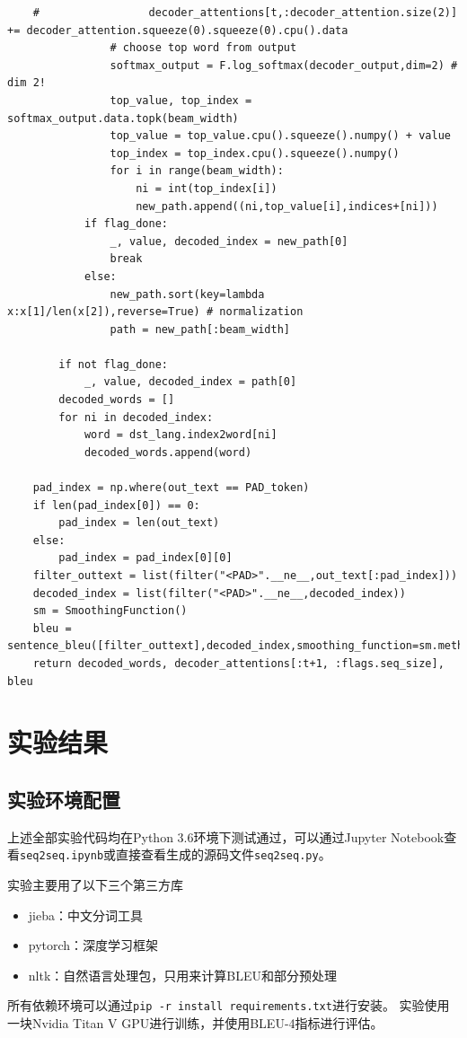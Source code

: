 \documentclass[logo,reportComp]{thesis}
\begin{document}
\begin{lstlisting}
    #                 decoder_attentions[t,:decoder_attention.size(2)] += decoder_attention.squeeze(0).squeeze(0).cpu().data
                # choose top word from output
                softmax_output = F.log_softmax(decoder_output,dim=2) # dim 2!
                top_value, top_index = softmax_output.data.topk(beam_width)
                top_value = top_value.cpu().squeeze().numpy() + value
                top_index = top_index.cpu().squeeze().numpy()
                for i in range(beam_width):
                    ni = int(top_index[i])
                    new_path.append((ni,top_value[i],indices+[ni]))
            if flag_done:
                _, value, decoded_index = new_path[0]
                break
            else:
                new_path.sort(key=lambda x:x[1]/len(x[2]),reverse=True) # normalization
                path = new_path[:beam_width]

        if not flag_done:
            _, value, decoded_index = path[0]
        decoded_words = []
        for ni in decoded_index:
            word = dst_lang.index2word[ni]
            decoded_words.append(word)

    pad_index = np.where(out_text == PAD_token)
    if len(pad_index[0]) == 0:
        pad_index = len(out_text)
    else:
        pad_index = pad_index[0][0]
    filter_outtext = list(filter("<PAD>".__ne__,out_text[:pad_index]))
    decoded_index = list(filter("<PAD>".__ne__,decoded_index))
    sm = SmoothingFunction()
    bleu = sentence_bleu([filter_outtext],decoded_index,smoothing_function=sm.method4)
    return decoded_words, decoder_attentions[:t+1, :flags.seq_size], bleu
\end{lstlisting}

\section{实验结果}
\subsection{实验环境配置}
上述全部实验代码均在Python 3.6环境下测试通过，可以通过Jupyter Notebook查看\verb'seq2seq.ipynb'或直接查看生成的源码文件\verb'seq2seq.py'。

实验主要用了以下三个第三方库
\begin{itemize}
    \item jieba：中文分词工具
    \item pytorch：深度学习框架
    \item nltk：自然语言处理包，只用来计算BLEU和部分预处理
\end{itemize}
所有依赖环境可以通过\verb'pip -r install requirements.txt'进行安装。
实验使用一块Nvidia Titan V GPU进行训练，并使用BLEU-4指标进行评估。
\end{document}
